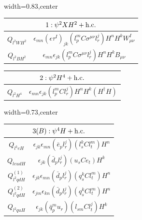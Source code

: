 \begin{table}[H]
\hspace{-0.5cm}
\begin{center}
\begin{adjustbox}{width=0.83\textwidth,center}
\small
\begin{minipage}[t]{6.3cm}
\renewcommand{\arraystretch}{1.5}
\begin{tabular}[t]{c|c}
\multicolumn{2}{c}{\boldmath$1:\psi^2XH^2+\mathrm{h.c.}$} \\
\hline
$Q_{l^2WH^2}$  &  $\epsilon_{mn} (\epsilon \tau^I)_{jk} (l_p^m C \sigma^{\mu\nu} l_r^j) H^n H^k W_{\mu\nu}^I$  \\ \hdashline
$Q_{l^2BH^2}$   &  $\epsilon_{mn} \epsilon_{jk} (l_p^m C \sigma^{\mu\nu} l_r^j) H^n H^k B_{\mu\nu}$ 
\end{tabular}
\end{minipage}
\hspace{1cm}
%
\begin{minipage}[t]{5.1cm}
\renewcommand{\arraystretch}{1.5}
\begin{tabular}[t]{c|c}
\multicolumn{2}{c}{\boldmath$2:\psi^2H^4+\mathrm{h.c.}$} \\
\hline
$Q_{l^2H^4}$  &  $\epsilon_{mn} \epsilon_{jk} (l_p^m C l_r^j)H^n H^k (H^\dag H)$ 
\end{tabular}
\end{minipage}
\end{adjustbox}
%
\begin{adjustbox}{width=0.73\textwidth,center}
\small
\begin{minipage}[t]{4.8cm}
\renewcommand{\arraystretch}{1.5}
\begin{tabular}[t]{c|c}
\multicolumn{2}{c}{\boldmath$3(B):\psi^4H+\mathrm{h.c.}$} \\
\hline
$Q_{l^3eH}$  &  $\epsilon_{jk} \epsilon_{mn} (\bar{e}_p l_r^j) (l_s^k C l_t^m) H^n $ \\
$Q_{leudH}$  &  $\epsilon_{jk} (\bar{d}_p l_r^j) (u_s C e_t) H^k $ \\
$Q_{l^2qdH}^{(1)}$  &  $\epsilon_{jk} \epsilon_{mn} (\bar{d}_p l_r^j) (q_s^k C l_t^m) H^n $ \\
$Q_{l^2qdH}^{(2)}$  &  $\epsilon_{jm} \epsilon_{kn} (\bar{d}_p l_r^j) (q_s^k C l_t^m) H^n $ \\
$Q_{l^2quH}$  &  $\epsilon_{jk} (\bar{q}_p^m u_r) (l_{sm} C l_t^j) H^k $ 
\end{tabular}
\end{minipage}
%
\hspace{1cm}
\begin{minipage}[t]{5.1cm}

\end{minipage}
\end{adjustbox}
\end{center}
\end{table}
